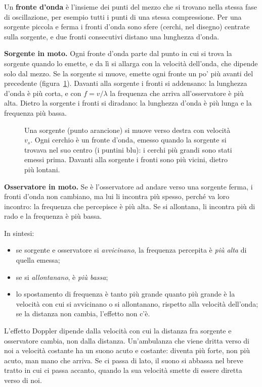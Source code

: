 Un \textbf{fronte d'onda} è l'insieme dei punti del mezzo che si trovano nella stessa fase di oscillazione, per esempio tutti i punti di una stessa compressione. Per una sorgente piccola e ferma i fronti d'onda sono sfere (cerchi, nel disegno) centrate sulla sorgente, e due fronti consecutivi distano una lunghezza d'onda.

\textbf{Sorgente in moto.} Ogni fronte d'onda parte dal punto in cui si trova la sorgente quando lo emette, e da lì si allarga con la velocità dell'onda, che dipende solo dal mezzo. Se la sorgente si muove, emette ogni fronte un po' più avanti del precedente (figura~\ref{fig:ud4-doppler}). Davanti alla sorgente i fronti si addensano: la lunghezza d'onda è più corta, e con $f = v/\lambda$ la frequenza che arriva all'osservatore è più alta. Dietro la sorgente i fronti si diradano: la lunghezza d'onda è più lunga e la frequenza più bassa.

\begin{figure}[h]
\centering

\caption{Una sorgente (punto arancione) si muove verso destra con velocità $v_s$. Ogni cerchio è un fronte d'onda, emesso quando la sorgente si trovava nel suo centro (i puntini blu): i cerchi più grandi sono stati emessi prima. Davanti alla sorgente i fronti sono più vicini, dietro più lontani.}
\label{fig:ud4-doppler}
\end{figure}

\textbf{Osservatore in moto.} Se è l'osservatore ad andare verso una sorgente ferma, i fronti d'onda non cambiano, ma lui li incontra più spesso, perché va loro incontro: la frequenza che percepisce è più alta. Se si allontana, li incontra più di rado e la frequenza è più bassa.

In sintesi:
\begin{itemize}
  \item se sorgente e osservatore si \emph{avvicinano}, la frequenza percepita è \emph{più alta} di quella emessa;
  \item se si \emph{allontanano}, è \emph{più bassa};
  \item lo spostamento di frequenza è tanto più grande quanto più grande è la velocità con cui si avvicinano o si allontanano, rispetto alla velocità dell'onda; se la distanza non cambia, l'effetto non c'è.
\end{itemize}

\begin{attenzione}
L'effetto Doppler dipende dalla velocità con cui la distanza fra sorgente e osservatore cambia, non dalla distanza. Un'ambulanza che viene dritta verso di noi a velocità costante ha un suono acuto e costante: diventa più forte, non più acuto, man mano che arriva. Se ci passa di lato, il suono si abbassa nel breve tratto in cui ci passa accanto, quando la sua velocità smette di essere diretta verso di noi.
\end{attenzione}

